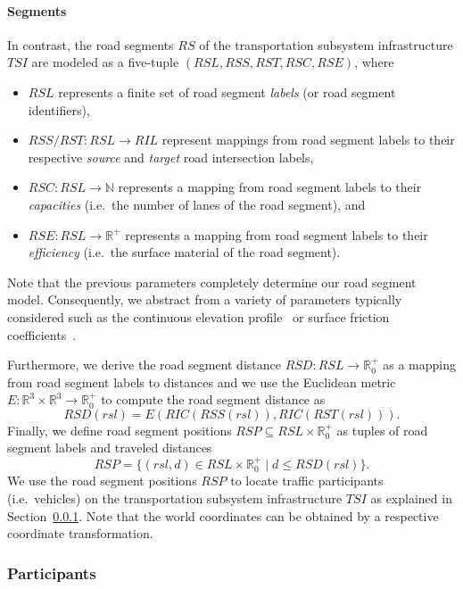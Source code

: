 \paragraph{Segments}
\label{segments}

In contrast, the road segments $RS$ of the transportation subsystem infrastructure $TSI$ are modeled as a five-tuple $(RSL, RSS, RST, RSC, RSE)$, where
\begin{itemize}
	\item $RSL$ represents a finite set of road segment \textit{labels} (or road segment identifiers),
	\item $RSS/RST: RSL \rightarrow RIL$ represent mappings from road segment labels to their respective \textit{source} and \textit{target} road intersection labels,
	\item $RSC: RSL \rightarrow \mathbb{N}$ represents a mapping from road segment labels to their \textit{capacities} (i.e.\ the number of lanes of the road segment), and
	\item $RSE: RSL \rightarrow \mathbb{R}^+$ represents a mapping from road segment labels to their \textit{efficiency} (i.e.\ the surface material of the road segment).
\end{itemize}
Note that the previous parameters completely determine our road segment model. Consequently, we abstract from a variety of parameters typically considered such as the continuous elevation profile~\cite{?} or surface friction coefficients~\cite{?}.

Furthermore, we derive the road segment distance $RSD: RSL \rightarrow \mathbb{R}_0^+$ as a mapping from road segment labels to distances and we use the Euclidean metric $E: \mathbb{R}^3 \times \mathbb{R}^3 \rightarrow \mathbb{R}_0^+$ to compute the road segment distance as
\[
	RSD(rsl) = E(RIC(RSS(rsl)), RIC(RST(rsl))) \textrm{.}
\]
Finally, we define road segment positions $RSP \subseteq RSL \times \mathbb{R}_0^+$ as tuples of road segment labels and traveled distances
\[
	RSP = \{(rsl, d) \in RSL \times \mathbb{R}_0^+ \mid d \leq RSD(rsl)\} \textrm{.}
\]
We use the road segment positions $RSP$ to locate traffic participants (i.e.\ vehicles) on the transportation subsystem infrastructure $TSI$ as explained in Section~\ref{participants}. Note that the world coordinates can be obtained by a respective coordinate transformation.

\subsubsection{Participants}
\label{participants}

